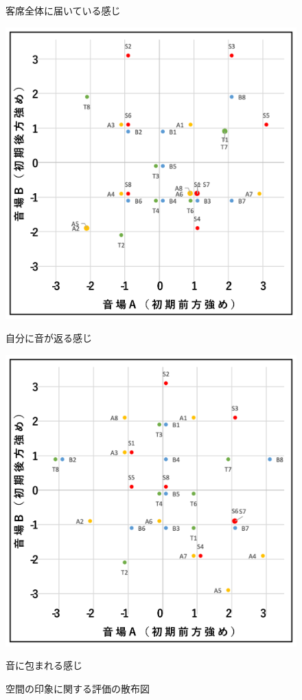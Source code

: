 \documentclass[11pt,a4j]{jreport}
\begin{document}
\begin{figure}[H]
\begin{minipage}{0.5\linewidth}
    \caption*{客席全体に届いている感じ}
  \end{minipage}
  \begin{minipage}{.5\linewidth}
    \centering
    \includegraphics[width=.9\linewidth]{images/subjectiveExp/scat_early_06returnSelf.png}
    \caption*{自分に音が返る感じ}
  \end{minipage}%
  \begin{minipage}{.5\linewidth}
    \centering
    \includegraphics[width=.9\linewidth]{images/subjectiveExp/scat_early_07surrounded.png}
    \caption*{音に包まれる感じ}
  \end{minipage}

  \caption{空間の印象に関する評価の散布図}
  \label{fig:空間の印象に関する評価の散布図}
\end{figure}
\end{document}
